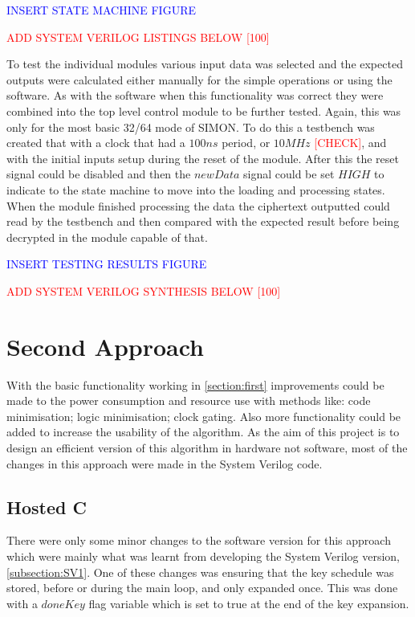 \documentclass[12pt,twoside,a4paper]{report}
\begin{document}
	\textcolor{blue}{INSERT STATE MACHINE FIGURE}
    
	\textcolor{red}{ADD SYSTEM VERILOG LISTINGS BELOW [100]}
	
	To test the individual modules various input data was selected and the expected outputs were calculated either manually for the simple operations or using the software. As with the software when this functionality was correct they were combined into the top level control module to be further tested. Again, this was only for the most basic 32/64 mode of SIMON. To do this a testbench was created that with a clock that had a $100ns$ period, or $10MHz$ \textcolor{red}{[CHECK]}, and with the initial inputs setup during the reset of the module. After this the reset signal could be disabled and then the $newData$ signal could be set $HIGH$ to indicate to the state machine to move into the loading and processing states. When the module finished processing the data the ciphertext outputted could read by the testbench and then compared with the expected result before being decrypted in the module capable of that.
	
	\textcolor{blue}{INSERT TESTING RESULTS FIGURE}
    
	\textcolor{red}{ADD SYSTEM VERILOG SYNTHESIS BELOW [100]}
    
	\section{Second Approach}
	\label{section:second}
	With the basic functionality working in \autoref{section:first} improvements could be made to the power consumption and resource use with methods like: code minimisation; logic minimisation; clock gating. Also more functionality could be added to increase the usability of the algorithm. As the aim of this project is to design an efficient version of this algorithm in hardware not software, most of the changes in this approach were made in the System Verilog code.
    
	\subsection{Hosted C}
	\label{subsection:HOSTED2}
	
	There were only some minor changes to the software version for this approach which were mainly what was learnt from developing the System Verilog version, \autoref{subsection:SV1}. One of these changes was ensuring that the key schedule was stored, before or during the main loop, and only expanded once. This was done with a $doneKey$ flag variable which is set to true at the end of the key expansion.
	
\end{document}
